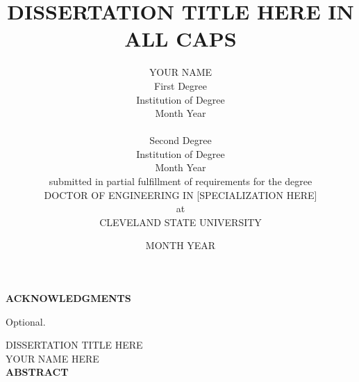 \doublespacing
\title{{\large DISSERTATION TITLE HERE IN ALL CAPS}} 
\author{\uppercase{Your Name}\\[0.5in]               
First Degree \\                                      
Institution of Degree \\
Month Year \\ \\
Second Degree \\
Institution of Degree \\
Month Year \\[0.5in]
submitted in partial fulfillment of requirements for the degree \\ \uppercase{Doctor of Engineering in [specialization here]} \\ at \\ \uppercase{Cleveland State University}}
\date{\uppercase{MONTH} YEAR}

\maketitle
\clearpage

\newpage
\begin{center}
\textbf{\uppercase{Acknowledgments}}\\
\end{center}
\pagestyle{empty}

Optional. 

\newpage 

\pagestyle{plain}
\setcounter{page}{3} %
\begin{center}
\uppercase{Dissertation Title Here}\\ %
\uppercase{Your Name Here}\\          %
\textbf{\uppercase{abstract}}\\
\end{center}

